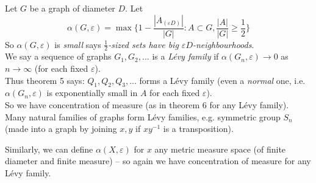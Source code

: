 \documentclass[a4paper]{article}
\begin{document}
Let $G$ be a graph of diameter $D$. Let
$$\alpha(G,\varepsilon) = \max\{1-\frac{|A_{(\varepsilon D)}|}{|G|}: A \subset G, \frac{|A|}{|G|} \geq \frac{1}{2}\}$$
So $\alpha(G,\varepsilon)$ is \emph{small} says \emph{$\frac{1}{2}$-sized sets have big $\varepsilon D$-neighbourhoods}.\\
We say a sequence of graphs $G_1,G_2,...$ is a \emph{L\'evy family} if $\alpha(G_n,\varepsilon) \to 0$ as $n \to \infty$ (for each fixed $\varepsilon$).\\
Thus theorem 5 says: $Q_1,Q_2,Q_3,...$ forms a L\'evy family (even a \emph{normal} one, i.e. $\alpha(G_n,\varepsilon)$ is exponentially small in $A$ for each fixed $\varepsilon$).\\
So we have concentration of measure (as in theorem 6 for any L\'evy family).\\
Many natural families of graphs form L\'evy families, e.g. symmetric group $S_n$ (made into a graph by joining $x,y$ if $xy^{-1}$ is a transposition).

Similarly, we can define $\alpha(X,\varepsilon)$ for $x$ any metric measure space (of finite diameter and finite measure) -- so again we have concentration of measure for any L\'evy family.\\
\end{document}
